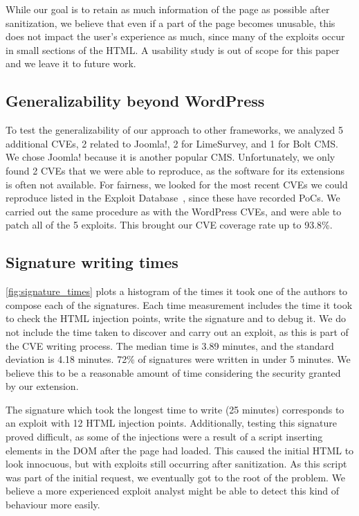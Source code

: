 While our goal is to retain as much information of the page as
possible after sanitization, we believe that even if a part of the
page becomes unusable, this does not impact the user's experience as
much, since many of the exploits occur in small sections of the
HTML. A usability study is out of scope for this paper and we leave it
to future work.


\subsection{Generalizability beyond WordPress}
\label{generalizability}

To test the generalizability of our approach to other frameworks, we
analyzed 5 additional CVEs, 2 related to Joomla!, 2 for LimeSurvey,
and 1 for Bolt CMS.  We chose Joomla! because it is another
popular \ac{CMS}. Unfortunately, we only found 2 CVEs
that we were able to reproduce, as the software for its extensions is
often not available. For fairness, we looked for the most recent CVEs
we could reproduce listed in the Exploit Database~\cite{exploitdb}, since
these have recorded \acp{PoC}. We carried out the same
procedure as with the WordPress CVEs, and were able to patch all of
the 5 exploits. This brought our CVE coverage rate up to 93.8\%.

\subsection{Signature writing times} \label{signature_times}

\autoref{fig:signature_times} plots a histogram of the times it took
one of the authors to compose each of the signatures. Each time
measurement includes the time it took to check the HTML injection
points, write the signature and to debug it. We do not include the
time taken to discover and carry out an exploit, as this is part of
the CVE writing process. The median time is 3.89 minutes, and the
standard deviation is 4.18 minutes. 72\% of signatures were written in
under 5 minutes. We believe this to be a reasonable amount of time
considering the security granted by our extension.

The signature which took the longest time to write (25 minutes)
corresponds to an exploit with 12 HTML injection points. Additionally,
testing this signature proved difficult, as some of
the injections were a result of a script inserting elements in the DOM
after the page had loaded. This caused the initial HTML to look
innocuous, but with exploits still occurring after sanitization. As
this script was part of the initial request, we eventually got to the
root of the problem. We believe a more experienced exploit analyst
might be able to detect this kind of behaviour more
easily. %

